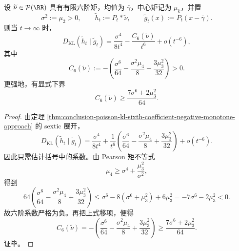 \begin{theorem}\label{thm:conclusion-poisson-cauchy-kl-sixth-correction-negative-lowerbound}
设 \(\widetilde\nu\in\mathcal P(\RR)\) 具有有限六阶矩，均值为 \(\bar\gamma\)，中心矩记为 \(\mu_k\)，并置
\[
\sigma^2:=\mu_2>0,
\qquad
\widetilde h_t:=P_t*\widetilde\nu,
\qquad
\widetilde g_t(x):=P_t(x-\bar\gamma).
\]
则当 \(t\to\infty\) 时，
\[
D_{\mathrm{KL}}(\widetilde h_t\mid \widetilde g_t)
=
\frac{\sigma^4}{8t^4}
-\frac{C_6(\widetilde\nu)}{t^6}
+o(t^{-6}),
\]
其中
\[
C_6(\widetilde\nu)
:=
-\left(
\frac{\sigma^6}{64}
-\frac{\sigma^2\mu_4}{8}
+\frac{3\mu_3^2}{32}
\right)
>0.
\]
更强地，有显式下界
\[
C_6(\widetilde\nu)\ge \frac{7\sigma^6+2\mu_3^2}{64}.
\]
\end{theorem}
\begin{proof}
由定理 \ref{thm:conclusion-poisson-kl-sixth-coefficient-negative-monotone-approach} 的 sextic 展开，
\[
D_{\mathrm{KL}}(\widetilde h_t\mid \widetilde g_t)
=
\frac{\sigma^4}{8t^4}
+
\frac{1}{t^6}
\left(
\frac{\sigma^6}{64}
-\frac{\sigma^2\mu_4}{8}
+\frac{3\mu_3^2}{32}
\right)
+o(t^{-6}).
\]
因此只需估计括号中的系数。由 Pearson 矩不等式
\[
\mu_4\ge \sigma^4+\frac{\mu_3^2}{\sigma^2},
\]
得到
\[
64\left(
\frac{\sigma^6}{64}
-\frac{\sigma^2\mu_4}{8}
+\frac{3\mu_3^2}{32}
\right)
\le
\sigma^6-8\left(\sigma^6+\mu_3^2\right)+6\mu_3^2
=
-7\sigma^6-2\mu_3^2<0.
\]
故六阶系数严格为负。再把上式移项，便得
\[
C_6(\widetilde\nu)
=
-\left(
\frac{\sigma^6}{64}
-\frac{\sigma^2\mu_4}{8}
+\frac{3\mu_3^2}{32}
\right)
\ge
\frac{7\sigma^6+2\mu_3^2}{64}.
\]
证毕。
\end{proof}

